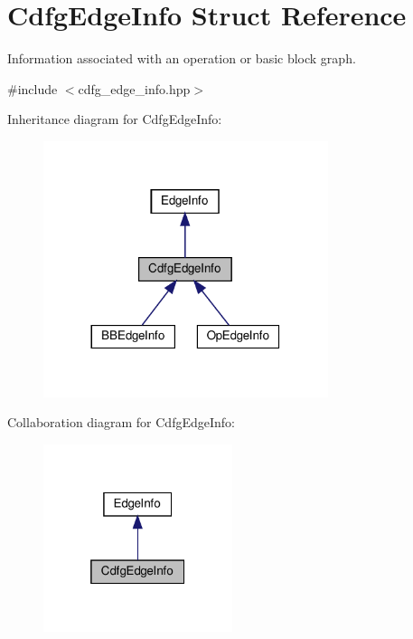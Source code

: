 \hypertarget{structCdfgEdgeInfo}{}\section{Cdfg\+Edge\+Info Struct Reference}
\label{structCdfgEdgeInfo}


Information associated with an operation or basic block graph.  




{\ttfamily \#include $<$cdfg\+\_\+edge\+\_\+info.\+hpp$>$}



Inheritance diagram for Cdfg\+Edge\+Info\+:
\nopagebreak
\begin{figure}[H]
\begin{center}
\leavevmode
\includegraphics[width=236pt]{d2/dce/structCdfgEdgeInfo__inherit__graph}
\end{center}
\end{figure}


Collaboration diagram for Cdfg\+Edge\+Info\+:
\nopagebreak
\begin{figure}[H]
\begin{center}
\leavevmode
\includegraphics[width=157pt]{da/d41/structCdfgEdgeInfo__coll__graph}
\end{center}
\end{figure}
